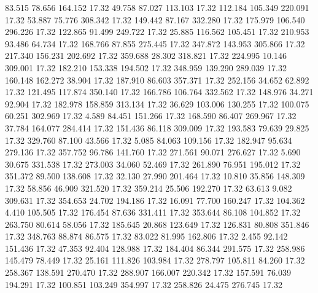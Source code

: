   83.515   78.656  164.152        17.32
  49.758   87.027  113.103        17.32
 112.184  105.349  220.091        17.32
  53.887   75.776  308.342        17.32
 149.442   87.167  332.280        17.32
 175.979  106.540  296.226        17.32
 122.865   91.499  249.722        17.32
  25.885  116.562  105.451        17.32
 210.953   93.486   64.734        17.32
 168.766   87.855  275.445        17.32
 347.872  143.953  305.866        17.32
 217.340  156.231  202.692        17.32
 359.688   28.302  318.821        17.32
 224.995   10.146  309.001        17.32
 182.210  153.338  194.502        17.32
 348.959  139.290  289.039        17.32
 160.148  162.272   38.904        17.32
 187.910   86.603  357.371        17.32
 252.156   34.652   62.892        17.32
 121.495  117.874  350.140        17.32
 166.786  106.764  332.562        17.32
 148.976   34.271   92.904        17.32
 182.978  158.859  313.134        17.32
  36.629  103.006  130.255        17.32
 100.075   60.251  302.969        17.32
   4.589   84.451  151.266        17.32
 168.590   86.407  269.967        17.32
  37.784  164.077  284.414        17.32
 151.436   86.118  309.009        17.32
 193.583   79.639   29.825        17.32
 329.760   87.100   43.566        17.32
   5.085   84.063  109.156        17.32
 182.947   95.634  279.136        17.32
 357.752   96.786  141.760        17.32
 271.561   90.071  276.627        17.32
   5.690   30.675  331.538        17.32
 273.003   34.060   52.469        17.32
 261.890   76.951  195.012        17.32
 351.372   89.500  138.608        17.32
  32.130   27.990  201.464        17.32
  10.810   35.856  148.309        17.32
  58.856   46.909  321.520        17.32
 359.214   25.506  192.270        17.32
  63.613    9.082  309.631        17.32
 354.653   24.702  194.186        17.32
  16.091   77.700  160.247        17.32
 104.362    4.410  105.505        17.32
 176.454   87.636  331.411        17.32
 353.644   86.108  104.852        17.32
 263.750   80.614   58.056        17.32
 185.645   20.868  123.649        17.32
 126.831   80.808  351.846        17.32
 348.763   88.874   86.575        17.32
  83.022   81.995  162.806        17.32
   2.455   92.142  151.436        17.32
  47.353   92.404  128.988        17.32
 184.404   86.344  291.575        17.32
 258.986  145.479   78.449        17.32
  25.161  111.826  103.984        17.32
 278.797  105.811   84.260        17.32
 258.367  138.591  270.470        17.32
 288.907  166.007  220.342        17.32
 157.591   76.039  194.291        17.32
 100.851  103.249  354.997        17.32
 258.826   24.475  276.745        17.32
